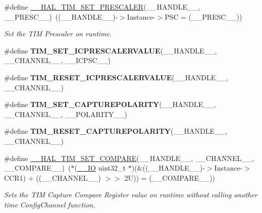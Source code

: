 \begin{DoxyCompactItemize}
\#define \mbox{\hyperlink{group___t_i_m___exported___macros_gafdc5a06eab07e0c24e729fd492bdb27c}{\+\_\+\+\_\+\+H\+A\+L\+\_\+\+T\+I\+M\+\_\+\+S\+E\+T\+\_\+\+P\+R\+E\+S\+C\+A\+L\+ER}}(\+\_\+\+\_\+\+H\+A\+N\+D\+L\+E\+\_\+\+\_\+,  \+\_\+\+\_\+\+P\+R\+E\+S\+C\+\_\+\+\_\+)~((\+\_\+\+\_\+\+H\+A\+N\+D\+L\+E\+\_\+\+\_\+)-\/$>$Instance-\/$>$P\+SC = (\+\_\+\+\_\+\+P\+R\+E\+S\+C\+\_\+\+\_\+))
\begin{DoxyCompactList}\small\item\em Set the T\+IM Prescaler on runtime. \end{DoxyCompactList}\item 
\#define {\bfseries T\+I\+M\+\_\+\+S\+E\+T\+\_\+\+I\+C\+P\+R\+E\+S\+C\+A\+L\+E\+R\+V\+A\+L\+UE}(\+\_\+\+\_\+\+H\+A\+N\+D\+L\+E\+\_\+\+\_\+,  \+\_\+\+\_\+\+C\+H\+A\+N\+N\+E\+L\+\_\+\+\_\+,  \+\_\+\+\_\+\+I\+C\+P\+S\+C\+\_\+\+\_\+)
\item 
\#define {\bfseries T\+I\+M\+\_\+\+R\+E\+S\+E\+T\+\_\+\+I\+C\+P\+R\+E\+S\+C\+A\+L\+E\+R\+V\+A\+L\+UE}(\+\_\+\+\_\+\+H\+A\+N\+D\+L\+E\+\_\+\+\_\+,  \+\_\+\+\_\+\+C\+H\+A\+N\+N\+E\+L\+\_\+\+\_\+)
\item 
\#define {\bfseries T\+I\+M\+\_\+\+S\+E\+T\+\_\+\+C\+A\+P\+T\+U\+R\+E\+P\+O\+L\+A\+R\+I\+TY}(\+\_\+\+\_\+\+H\+A\+N\+D\+L\+E\+\_\+\+\_\+,  \+\_\+\+\_\+\+C\+H\+A\+N\+N\+E\+L\+\_\+\+\_\+,  \+\_\+\+\_\+\+P\+O\+L\+A\+R\+I\+T\+Y\+\_\+\+\_\+)
\item 
\#define {\bfseries T\+I\+M\+\_\+\+R\+E\+S\+E\+T\+\_\+\+C\+A\+P\+T\+U\+R\+E\+P\+O\+L\+A\+R\+I\+TY}(\+\_\+\+\_\+\+H\+A\+N\+D\+L\+E\+\_\+\+\_\+,  \+\_\+\+\_\+\+C\+H\+A\+N\+N\+E\+L\+\_\+\+\_\+)
\item 
\#define \mbox{\hyperlink{group___t_i_m___exported___macros_ga300d0c9624c3b072d3afeb7cef639b66}{\+\_\+\+\_\+\+H\+A\+L\+\_\+\+T\+I\+M\+\_\+\+S\+E\+T\+\_\+\+C\+O\+M\+P\+A\+RE}}(\+\_\+\+\_\+\+H\+A\+N\+D\+L\+E\+\_\+\+\_\+,  \+\_\+\+\_\+\+C\+H\+A\+N\+N\+E\+L\+\_\+\+\_\+,  \+\_\+\+\_\+\+C\+O\+M\+P\+A\+R\+E\+\_\+\+\_\+)~($\ast$(\mbox{\hyperlink{core__sc300_8h_aec43007d9998a0a0e01faede4133d6be}{\+\_\+\+\_\+\+IO}} uint32\+\_\+t $\ast$)(\&((\+\_\+\+\_\+\+H\+A\+N\+D\+L\+E\+\_\+\+\_\+)-\/$>$Instance-\/$>$C\+C\+R1) + ((\+\_\+\+\_\+\+C\+H\+A\+N\+N\+E\+L\+\_\+\+\_\+) $>$$>$ 2\+U)) = (\+\_\+\+\_\+\+C\+O\+M\+P\+A\+R\+E\+\_\+\+\_\+))
\begin{DoxyCompactList}\small\item\em Sets the T\+IM Capture Compare Register value on runtime without calling another time Config\+Channel function. \end{DoxyCompactList}\item 
$$
\end{DoxyCompactItemize}
